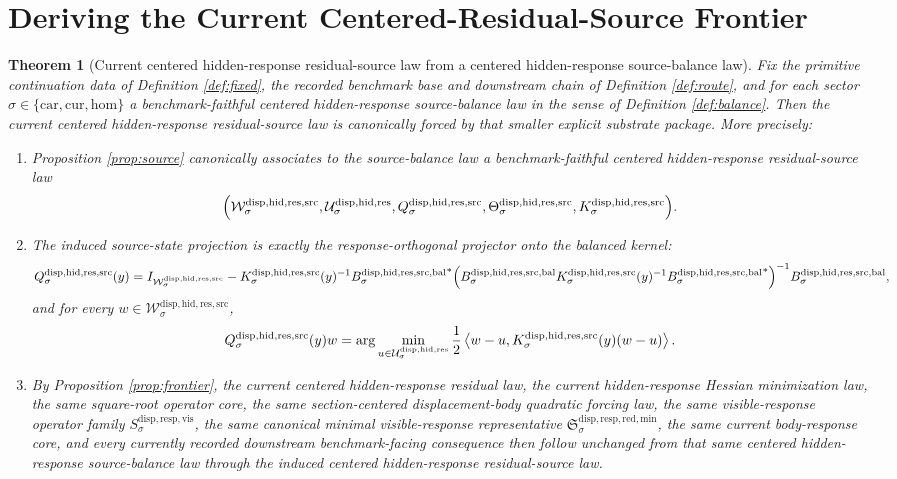 \documentclass[11pt]{article}
\newcommand{\Car}{\mathrm{car}}
\newcommand{\Cur}{\mathrm{cur}}
\newcommand{\Hom}{\mathrm{hom}}
\newcommand{\VisibleResponseOperator}[1]{S_{#1}^{\mathrm{disp,resp,vis}}}
\newcommand{\MinimalReducedStructure}{\mathfrak S^{\mathrm{disp,resp,red,min}}}
\newcommand{\ResidualState}[1]{\mathcal U_{#1}^{\mathrm{disp,hid,res}}}
\newcommand{\ResidualSourceCarrier}[1]{\mathcal W_{#1}^{\mathrm{disp,hid,res,src}}}
\newcommand{\ResidualSourceProjection}[1]{Q_{#1}^{\mathrm{disp,hid,res,src}}}
\newcommand{\ResidualSourceReadout}[1]{\Theta_{#1}^{\mathrm{disp,hid,res,src}}}
\newcommand{\ResidualSourceOperator}[1]{K_{#1}^{\mathrm{disp,hid,res,src}}}
\newcommand{\SourceBalanceOperator}[1]{B_{#1}^{\mathrm{disp,hid,res,src,bal}}}
\newtheorem{theorem}{Theorem}
\begin{document}
\section{Deriving the Current Centered-Residual-Source Frontier}

\begin{theorem}[Current centered hidden-response residual-source law from a centered hidden-response source-balance law]
\label{thm:main}
Fix the primitive continuation data of Definition \ref{def:fixed}, the recorded benchmark base and downstream chain of Definition \ref{def:route}, and for each sector \(\sigma\in\{\Car,\Cur,\Hom\}\) a benchmark-faithful centered hidden-response source-balance law in the sense of Definition \ref{def:balance}. Then the current centered hidden-response residual-source law is canonically forced by that smaller explicit substrate package. More precisely:
\begin{enumerate}
    \item Proposition \ref{prop:source} canonically associates to the source-balance law a benchmark-faithful centered hidden-response residual-source law
    \[
    \Bigl(
    \ResidualSourceCarrier{\sigma},
    \ResidualState{\sigma},
    \ResidualSourceProjection{\sigma},
    \ResidualSourceReadout{\sigma},
    \ResidualSourceOperator{\sigma}
    \Bigr).
    \]
    \item The induced source-state projection is exactly the response-orthogonal projector onto the balanced kernel:
    \[
    \ResidualSourceProjection{\sigma}(y)
    =
    I_{\ResidualSourceCarrier{\sigma}}
    -\ResidualSourceOperator{\sigma}(y)^{-1}
    {\SourceBalanceOperator{\sigma}}^{*}
    \Bigl(
    \SourceBalanceOperator{\sigma}
    \ResidualSourceOperator{\sigma}(y)^{-1}
    {\SourceBalanceOperator{\sigma}}^{*}
    \Bigr)^{-1}
    \SourceBalanceOperator{\sigma},
    \]
    and for every \(w\in\ResidualSourceCarrier{\sigma}\),
    \[
    \ResidualSourceProjection{\sigma}(y)w
    =
    \arg\min_{u\in\ResidualState{\sigma}}
    \frac{1}{2}
    \ev{
    w-u,
    \ResidualSourceOperator{\sigma}(y)(w-u)
    }.
    \]
    \item By Proposition \ref{prop:frontier}, the current centered hidden-response residual law, the current hidden-response Hessian minimization law, the same square-root operator core, the same section-centered displacement-body quadratic forcing law, the same visible-response operator family \(\VisibleResponseOperator{\sigma}\), the same canonical minimal visible-response representative \(\MinimalReducedStructure_{\sigma}\), the same current body-response core, and every currently recorded downstream benchmark-facing consequence then follow unchanged from that same centered hidden-response source-balance law through the induced centered hidden-response residual-source law.

\end{enumerate}
\end{theorem}
\end{document}
